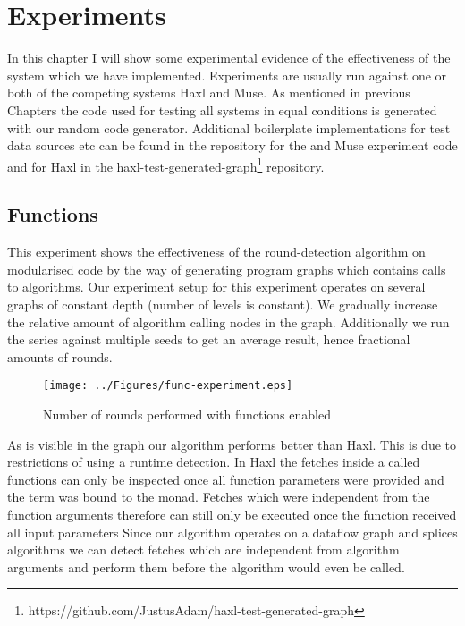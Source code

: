 \chapter{Experiments}

\label{ch:Experiments}

In this chapter I will show some experimental evidence of the effectiveness of the system which we have implemented.
Experiments are usually run against one or both of the competing systems Haxl\cite{Haxl:library:link} and Muse\cite{Muse:repository:link}.
As mentioned in previous Chapters the code used for testing all systems in equal conditions is generated with our random code generator\cite{Goens-rand-code-graph}.
Additional boilerplate implementations for test data sources etc can be found in the \yauhau{} repository\cite{Yauhau:repository:link} for the \yauhau{} and Muse experiment code and for Haxl in the haxl-test-generated-graph\footnote{https://github.com/JustusAdam/haxl-test-generated-graph} repository.

\section{Functions}

This experiment shows the effectiveness of the round-detection algorithm on modularised code by the way of generating program graphs which contains calls to algorithms.
Our experiment setup for this experiment operates on several graphs of constant depth (number of levels is constant).
We gradually increase the relative amount of algorithm calling nodes in the graph.
Additionally we run the series against multiple seeds to get an average result, hence fractional amounts of rounds.

\begin{figure}
    \texttt{[image: ../Figures/func-experiment.eps]}
    \caption{Number of rounds performed with functions enabled}
\end{figure}

As is visible in the graph our algorithm performs better than Haxl.
This is due to restrictions of using a runtime detection.
In Haxl the fetches inside a called functions can only be inspected once all function parameters were provided and the term was bound to the monad.
Fetches which were independent from the function arguments therefore can still only be executed once the function received all input parameters
Since our algorithm operates on a dataflow graph and splices algorithms we can detect fetches which are independent from algorithm arguments and perform them before the algorithm would even be called.

